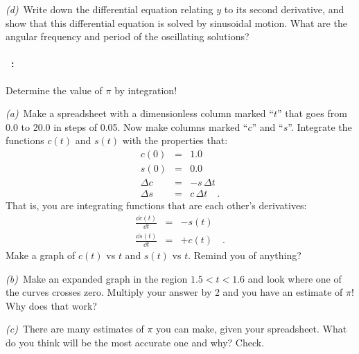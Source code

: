 \documentclass[12pt]{article}
\begin{document}
\textsl{(d)}~Write down the differential equation relating $y$ to its
second derivative, and show that this differential equation is solved
by sinusoidal motion. What are the angular frequency and period of the
oscillating solutions?

\paragraph{\problemname~\theproblem:}%
Determine the value of $\pi$ by integration!

\textsl{(a)}~Make a spreadsheet with a dimensionless column marked
``$t$'' that goes from 0.0 to 20.0 in steps of 0.05.  Now make columns
marked ``$c$'' and ``$s$''.  Integrate the functions $c(t)$ and
$s(t)$ with the properties that:
\begin{eqnarray}\displaystyle
  c(0) & = & 1.0 \\
  s(0) & = & 0.0 \\
  \Delta c & = & -s\,\Delta t \\
  \Delta s & = & c\,\Delta t
  \quad .
\end{eqnarray}
That is, you are integrating functions that are each other's derivatives:
\begin{eqnarray}\displaystyle
  \frac{\dd c(t)}{\dd t} &=& -s(t) \\
  \frac{\dd s(t)}{\dd t} &=& +c(t)
  \quad .
\end{eqnarray}
Make a graph of $c(t)$ vs $t$ and $s(t)$ vs $t$.  Remind you of anything?

\textsl{(b)}~Make an expanded graph in the region $1.5<t<1.6$ and
look where one of the curves crosses zero.  Multiply your answer by 2 and you
have an estimate of $\pi$!  Why does that work?

\textsl{(c)}~There are many estimates of $\pi$ you can make, given
your spreadsheet. What do you think will be the most accurate one and
why? Check.
\end{document}
